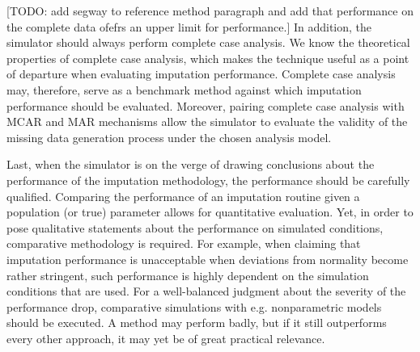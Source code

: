 \documentclass[bimj,fleqn]{w-art}
\begin{document}
[TODO: add segway to reference method paragraph and add that performance on the complete data ofefrs an upper limit for performance.] In addition, the simulator should always perform complete case analysis. We know the theoretical properties of complete case analysis, which makes the technique useful as a point of departure when evaluating imputation performance. Complete case analysis may, therefore, serve as a benchmark method against which imputation performance should be evaluated. Moreover, pairing complete case analysis with MCAR and MAR mechanisms allow the simulator to evaluate the validity of the missing data generation process under the chosen analysis model.












Last, when the simulator is on the verge of drawing conclusions about the performance of the imputation methodology, the performance should be carefully qualified. Comparing the performance of an imputation routine given a population (or true) parameter allows for quantitative evaluation. Yet, in order to pose qualitative statements about the performance on simulated conditions, comparative methodology is required. For example, when claiming that imputation performance is unacceptable when deviations from normality become rather stringent, such performance is highly dependent on the simulation conditions that are used. For a well-balanced judgment about the severity of the performance drop, comparative simulations with e.g. nonparametric models should be executed. A method may perform badly, but if it still outperforms every other approach, it may yet be of great practical relevance.

\end{document}
